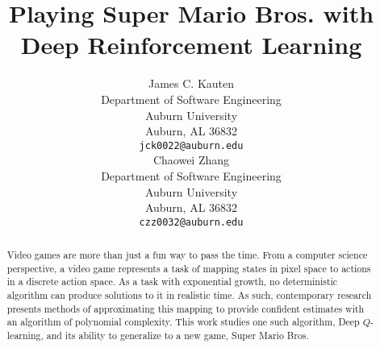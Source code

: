 \title{Playing Super Mario Bros. with Deep Reinforcement Learning}

\author{
	James C. Kauten \\
	Department of Software Engineering \\
	Auburn University \\
	Auburn, AL 36832 \\
	\texttt{jck0022@auburn.edu} \\
	\And
	Chaowei Zhang \\
	Department of Software Engineering \\
	Auburn University \\
	Auburn, AL 36832 \\
	\texttt{czz0032@auburn.edu} \\
}

\maketitle

\begin{abstract}

Video games are more than just a fun way to pass the time. From a computer
science perspective, a video game represents a task of mapping states in
pixel space to actions in a discrete action space. As a task with exponential
growth, no deterministic algorithm can produce solutions to it in realistic
time. As such, contemporary research presents methods of approximating this
mapping to provide confident estimates with an algorithm of polynomial
complexity. This work studies one such algorithm, Deep $Q$-learning, and its
ability to generalize to a new game, Super Mario Bros.

\end{abstract}
